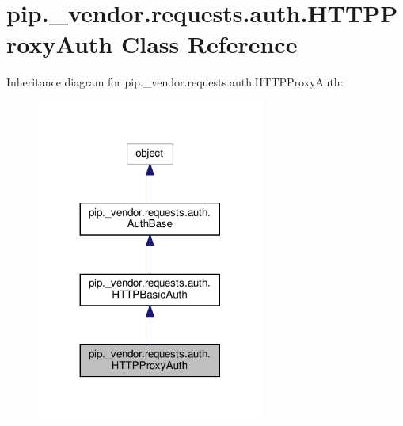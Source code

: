 \hypertarget{classpip_1_1__vendor_1_1requests_1_1auth_1_1HTTPProxyAuth}{}\section{pip.\+\_\+vendor.\+requests.\+auth.\+H\+T\+T\+P\+Proxy\+Auth Class Reference}
\label{classpip_1_1__vendor_1_1requests_1_1auth_1_1HTTPProxyAuth}


Inheritance diagram for pip.\+\_\+vendor.\+requests.\+auth.\+H\+T\+T\+P\+Proxy\+Auth\+:
\nopagebreak
\begin{figure}[H]
\begin{center}
\leavevmode
\includegraphics[width=212pt]{classpip_1_1__vendor_1_1requests_1_1auth_1_1HTTPProxyAuth__inherit__graph}
\end{center}
\end{figure}


